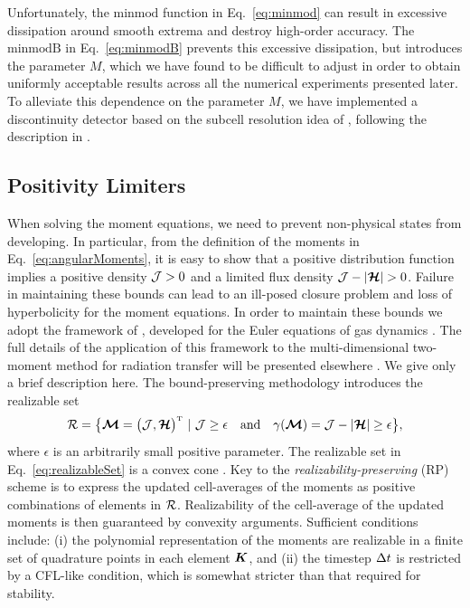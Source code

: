 \documentclass[10pt,preprint]{aastex}
\begin{document}
Unfortunately, the $\text{minmod}$ function in Eq.~\eqref{eq:minmod} can result in excessive dissipation around smooth extrema and destroy high-order accuracy.  
The $\text{minmodB}$ in Eq.~\eqref{eq:minmodB} prevents this excessive dissipation, but introduces the parameter $M$, which we have found to be difficult to adjust in order to obtain uniformly acceptable results across all the numerical experiments presented later.  
To alleviate this dependence on the parameter $M$, we have implemented a discontinuity detector based on the subcell resolution idea of \citet{harten_1989}, following the description in \citet{qiuShu_2005}.  

\subsection{Positivity Limiters}
\label{sec:positivityLimiters}

When solving the moment equations, we need to prevent non-physical states from developing.  
In particular, from the definition of the moments in Eq.~\eqref{eq:angularMoments}, it is easy to show that a positive distribution function implies a positive density $\mathcal{J}>0$ and a limited flux density $\cJ-|\bcH|>0$.  
Failure in maintaining these bounds can lead to an ill-posed closure problem and loss of hyperbolicity for the moment equations.  
In order to maintain these bounds we adopt the framework of \citet{ZS2010b}, developed for the Euler equations of gas dynamics \citep[see also][]{ZS2010a,ZS2011,OHF2012}.  
The full details of the application of this framework to the multi-dimensional two-moment method for radiation transfer will be presented elsewhere \citep{endeveHauck_2017}.  
We give only a brief description here.  
The bound-preserving methodology introduces the realizable set
\begin{equation}
  \mathcal{R}=\big\{\boldsymbol{\mathcal{M}}=\big(\mathcal{J},\boldsymbol{\mathcal{H}}\big)^{\mbox{\tiny T}}~|~\mathcal{J}\ge\epsilon\quad\text{and}\quad\gamma(\boldsymbol{\mathcal{M}})=\mathcal{J}-|\boldsymbol{\mathcal{H}}|\ge\epsilon\big\},
  \label{eq:realizableSet}
\end{equation}
where $\epsilon$ is an arbitrarily small positive parameter.  
The realizable set in Eq.~\eqref{eq:realizableSet} is a convex cone \citep{OHF2012}.  
Key to the \emph{realizability-preserving} (RP) scheme is to express the updated cell-averages of the moments as positive combinations of elements in $\mathcal{R}$.  
Realizability of the cell-average of the updated moments is then guaranteed by convexity arguments.  
Sufficient conditions include: (i) the polynomial representation of the moments are realizable in a finite set of quadrature points in each element $\boldsymbol{K}$, and (ii) the timestep $\Delta t$ is restricted by a CFL-like condition, which is somewhat stricter than that required for stability.  
\end{document}
